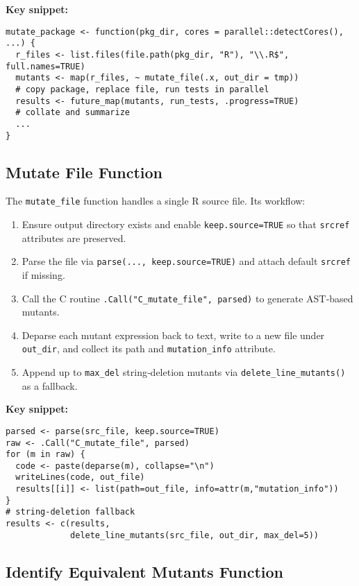 \medskip
\noindent\textbf{Key snippet:}
\begin{verbatim}
mutate_package <- function(pkg_dir, cores = parallel::detectCores(), ...) {
  r_files <- list.files(file.path(pkg_dir, "R"), "\\.R$", full.names=TRUE)
  mutants <- map(r_files, ~ mutate_file(.x, out_dir = tmp))
  # copy package, replace file, run tests in parallel
  results <- future_map(mutants, run_tests, .progress=TRUE)
  # collate and summarize
  ...
}
\end{verbatim}

\subsection{Mutate File Function}

The \texttt{mutate\_file} function handles a single R source file.  Its workflow:

\begin{enumerate}
  \item Ensure output directory exists and enable \texttt{keep.source=TRUE} so that \texttt{srcref} attributes are preserved.  
  \item Parse the file via \texttt{parse(..., keep.source=TRUE)} and attach default \texttt{srcref} if missing.  
  \item Call the C routine \texttt{.Call("C\_mutate\_file", parsed)} to generate AST‐based mutants.  
  \item Deparse each mutant expression back to text, write to a new file under \texttt{out\_dir}, and collect its path and \texttt{mutation\_info} attribute.  
  \item Append up to \texttt{max\_del} string‐deletion mutants via \texttt{delete\_line\_mutants()} as a fallback.
\end{enumerate}

\medskip
\noindent\textbf{Key snippet:}
\begin{verbatim}
parsed <- parse(src_file, keep.source=TRUE)
raw <- .Call("C_mutate_file", parsed)
for (m in raw) {
  code <- paste(deparse(m), collapse="\n")
  writeLines(code, out_file)
  results[[i]] <- list(path=out_file, info=attr(m,"mutation_info"))
}
# string‐deletion fallback
results <- c(results,
             delete_line_mutants(src_file, out_dir, max_del=5))
\end{verbatim}

\subsection{Identify Equivalent Mutants Function}

